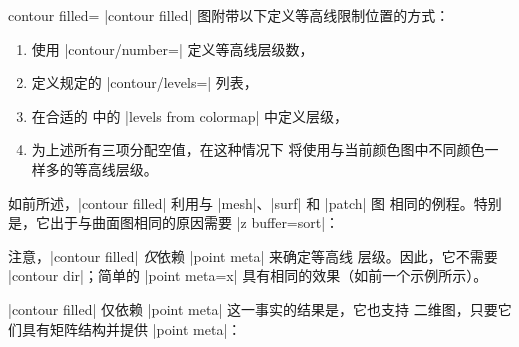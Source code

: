 {{\begin{plottype}[/pgfplots]{
    contour filled=\textcolor{black}{}%
}
    |contour filled| 图附带以下定义等高线限制位置的方式：
    \begin{enumerate}
        \item 使用 |contour/number=| 定义等高线层级数，
        \item 定义规定的 |contour/levels=| 列表，
        \item 在合适的  中的
            |levels from colormap| 中定义层级，
        \item 为上述所有三项分配空值，在这种情况下 \PGFPlots{}
            将使用与当前颜色图中不同颜色一样多的等高线层级。
    \end{enumerate}

    如前所述，|contour filled| 利用与 |mesh|、|surf| 和 |patch| 图
    相同的例程。特别是，它出于与曲面图相同的原因需要
    |z buffer=sort|：
\pgfplotsexpensiveexample
\begin{codeexample}[]
\end{codeexample}
    注意，|contour filled| \emph{仅}依赖 |point meta| 来确定等高线
    层级。因此，它不需要 |contour dir|；简单的 |point meta=x|
    具有相同的效果（如前一个示例所示）。

    |contour filled| 仅依赖 |point meta| 这一事实的结果是，它也支持
    二维图，只要它们具有矩阵结构并提供 |point meta|：
\begin{codeexample}[]
\end{codeexample}


\end{plottype}}}
